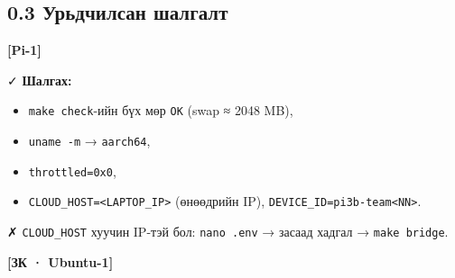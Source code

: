 \hypertarget{ux443ux440ux44cux434ux447ux438ux43bux441ux430ux43d-ux448ux430ux43bux433ux430ux43bux442}{%
\subsection{0.3 Урьдчилсан шалгалт}\label{ux443ux440ux44cux434ux447ux438ux43bux441ux430ux43d-ux448ux430ux43bux433ux430ux43bux442}}

\textbf{{[}Pi-1{]}}

\begin{Shaded}
\begin{Highlighting}[]
\KeywordTok{\&\&} 
\end{Highlighting}
\end{Shaded}

✓ \textbf{Шалгах:}

\begin{itemize}
\tightlist
\item
  \texttt{make\ check}-ийн бүх мөр \texttt{OK} (swap ≈ 2048 MB),
\item
  \texttt{uname\ -m} → \texttt{aarch64},
\item
  \texttt{throttled=0x0},
\item
  \texttt{CLOUD\_\allowbreak{}HOST=\allowbreak{}\textless{}LAPTOP\_\allowbreak{}IP\textgreater{}} (өнөөдрийн IP), \texttt{DEVICE\_\allowbreak{}ID=\allowbreak{}pi3b-team\textless{}NN\textgreater{}}.
\end{itemize}

✗ \texttt{CLOUD\_HOST} хуучин IP-тэй бол: \texttt{nano\ .env} → засаад хадгал → \texttt{make\ bridge}.

\textbf{{[}ЗК · Ubuntu-1{]}}

\begin{Shaded}
\begin{Highlighting}[]
\KeywordTok{\&\&} 
 \KeywordTok{|}  
\end{Highlighting}
\end{Shaded}

